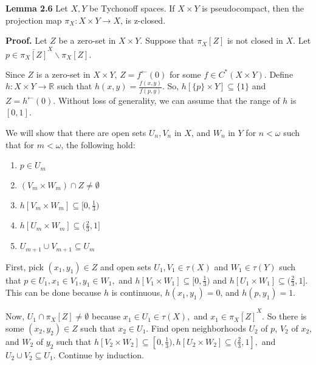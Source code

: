 \documentclass{article}
\begin{document}
\vskip 40pt













\textbf{Lemma 2.6} Let $X, Y$ be Tychonoff spaces. If $X\times Y$ is pseudocompact, then the projection map $\pi_X: X\times Y\rightarrow X$, is z-closed. 

\vskip 20pt

\textbf{Proof.} Let $Z$ be a zero-set in $X\times Y$. Suppose that $\pi_X[Z]$ is not closed in $X$. Let $p\in \overline{\pi_X[Z]}^X\backslash \pi_X[Z].$ 

\vskip 15pt

Since $Z$ is a zero-set in $X\times Y$, $Z=f^\leftarrow (0)$ for some $f\in C^*(X\times Y).$ Define $h: X\times Y\rightarrow \mathbb{R}$ such that $h(x,y)=\frac{f(x,y)}{f(p,y)}$. So, $h\left[\{p\}\times Y\right] \subseteq \{1\}$ and $Z=h^\leftarrow (0).$ Without loss of generality, we can assume that the range of $h$ is $[0,1]$. 
\vskip 10pt

We will show that there are open sets $U_n, V_n$ in $X$, and $W_n$ in $Y$ for $n<\omega$ such that for $m<\omega$, the following hold: 

\begin{enumerate}
	\item $p\in U_m$
	\item $(V_m\times W_m)\cap Z \neq \emptyset$
	\item $h\left[V_m\times W_m\right] \subseteq [0,\frac{1}{3})$
	\item $h\left[U_m\times W_m\right] \subseteq (\frac{2}{3},1]$
	\item $U_{m+1}\cup V_{m+1}\subseteq U_m$
\end{enumerate}

\vskip 5pt

First, pick $(x_1,y_1)\in Z$ and open sets $U_1,V_1\in \tau(X)$ and $W_1\in \tau(Y)$ such that $p\in U_1, x_1\in V_1, y_1\in W_1,$ and $h\left[V_1\times W_1\right] \subseteq [0,\frac{1}{3})$ and $h\left[U_1\times W_1\right] \subseteq (\frac{2}{3}, 1]$. This can be done because $h$ is continuous, $h(x_1,y_1)=0$, and $h(p,y_1)=1$.

\vskip 10pt

Now, $U_1\cap \pi_X[Z]\neq \emptyset$ because $x_1\in U_1\in \tau(X), $ and $x_1\in \overline{\pi_X[Z]}^X.$ So there is some $(x_2,y_2)\in Z$ such that $x_2\in U_1$. Find open neighborhoods $U_2$ of $p$, $V_2$ of $x_2$, and $W_2$ of $y_2$ such that $h\left[V_2\times W_2\right] \subseteq [0,\frac{1}{3}), h\left[U_2\times W_2\right]\subseteq (\frac{2}{3},1],$ and $U_2\cup V_2\subseteq U_1$. Continue by induction. 
\end{document}
